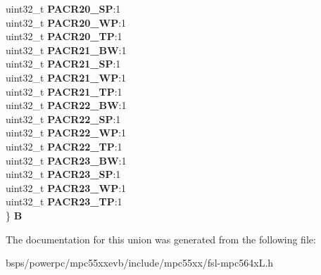 \begin{DoxyCompactItemize}
\begin{tabbing}
\>uint32\_t {\bfseries PACR20\_SP}:1\\
\>uint32\_t {\bfseries PACR20\_WP}:1\\
\>uint32\_t {\bfseries PACR20\_TP}:1\\
\>uint32\_t {\bfseries PACR21\_BW}:1\\
\>uint32\_t {\bfseries PACR21\_SP}:1\\
\>uint32\_t {\bfseries PACR21\_WP}:1\\
\>uint32\_t {\bfseries PACR21\_TP}:1\\
\>uint32\_t {\bfseries PACR22\_BW}:1\\
\>uint32\_t {\bfseries PACR22\_SP}:1\\
\>uint32\_t {\bfseries PACR22\_WP}:1\\
\>uint32\_t {\bfseries PACR22\_TP}:1\\
\>uint32\_t {\bfseries PACR23\_BW}:1\\
\>uint32\_t {\bfseries PACR23\_SP}:1\\
\>uint32\_t {\bfseries PACR23\_WP}:1\\
\>uint32\_t {\bfseries PACR23\_TP}:1\\
\} {\bfseries B}\\

\end{tabbing}\end{DoxyCompactItemize}


The documentation for this union was generated from the following file\+:\begin{DoxyCompactItemize}
\item 
bsps/powerpc/mpc55xxevb/include/mpc55xx/fsl-\/mpc564x\+L.\+h\end{DoxyCompactItemize}

